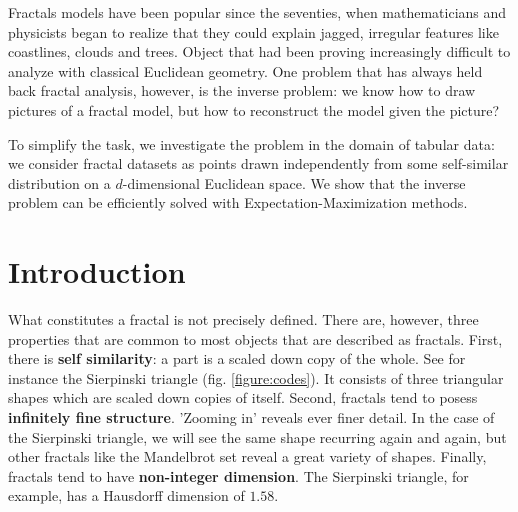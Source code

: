 Fractals models have been popular since the seventies, when mathematicians and physicists began to realize that they could explain jagged, irregular features like coastlines, clouds and trees. Object that had been proving increasingly difficult to analyze with  classical Euclidean geometry. One problem that has always held back fractal analysis, however, is the inverse problem: we know how to draw pictures of a fractal model, but how to reconstruct the model given the picture?

To simplify the task, we investigate the problem in the domain of tabular data: we consider fractal datasets as points drawn independently from some self-similar distribution on a $d$-dimensional Euclidean space. We show that the inverse problem can be efficiently solved with Expectation-Maximization methods.

\section{Introduction}
What constitutes a fractal is not precisely defined. \footnotemark There are, however, three properties that are common to most objects that are described as fractals. First, there is \textbf{self similarity}: a part is a scaled down copy of the whole. See for instance the Sierpinski triangle (fig. \ref{figure:codes}). It consists of three triangular shapes which are scaled down copies of itself. Second, fractals tend to posess \textbf{infinitely fine structure}. 'Zooming in' reveals ever finer detail. In the case of the Sierpinski triangle, we will see the same shape recurring again and again, but other fractals like the Mandelbrot set reveal a great variety of shapes.
Finally, fractals tend to have \textbf{non-integer dimension}. The Sierpinski triangle, for example, has a Hausdorff dimension of $1.58$. 
 
